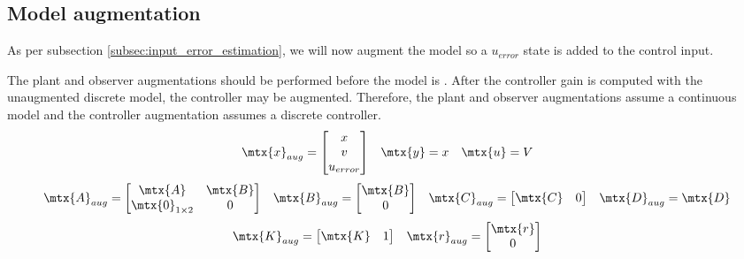 \subsection{Model augmentation}

As per subsection \ref{subsec:input_error_estimation}, we will now augment the
\gls{model} so a $u_{error}$ state is added to the \gls{control input}.

The \gls{plant} and \gls{observer} augmentations should be performed before the
\gls{model} is . After the \gls{controller}
gain is computed with the unaugmented discrete \gls{model}, the controller may
be augmented. Therefore, the \gls{plant} and \gls{observer} augmentations assume
a continuous \gls{model} and the \gls{controller} augmentation assumes a
discrete \gls{controller}.
\begin{equation*}
  \begin{array}{ccc}
    \mtx{x}_{aug} =
    \begin{bmatrix}
      x \\
      v \\
      u_{error}
    \end{bmatrix} &
    \mtx{y} = x &
    \mtx{u} = V
  \end{array}
\end{equation*}
\begin{equation}
  \begin{array}{cccc}
    \mtx{A}_{aug} =
    \begin{bmatrix}
      \mtx{A} & \mtx{B} \\
      \mtx{0}_{1 \times 2} & 0
    \end{bmatrix} &
    \mtx{B}_{aug} =
    \begin{bmatrix}
      \mtx{B} \\
      0
    \end{bmatrix} &
    \mtx{C}_{aug} = \begin{bmatrix}
      \mtx{C} & 0
    \end{bmatrix} &
    \mtx{D}_{aug} = \mtx{D}
  \end{array}
\end{equation}
\begin{equation}
  \begin{array}{cc}
    \mtx{K}_{aug} = \begin{bmatrix}
      \mtx{K} & 1
    \end{bmatrix} &
    \mtx{r}_{aug} = \begin{bmatrix}
      \mtx{r} \\
      0
    \end{bmatrix}
  \end{array}
\end{equation}

